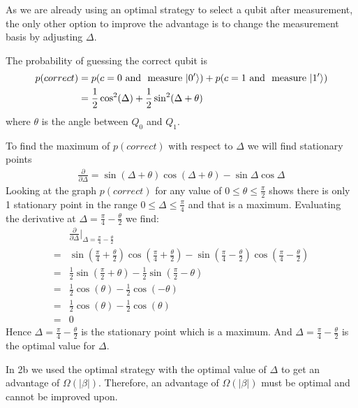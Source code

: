 As we are already using an optimal strategy to select a qubit after measurement, the only other option to improve the advantage is to change the measurement basis by adjusting $\Delta$.

The probability of guessing the correct qubit is 
\begin{align*}
    p(correct) &= p(c=0 \text{ and } \text{ measure } \lvert0'\rangle) + p(c=1 \text{ and } \text{ measure } \lvert1'\rangle)\\
    &=\frac{1}{2} \cos^2 (\Delta) + \frac{1}{2}\sin^2(\Delta + \theta) 
\end{align*}
where $\theta$ is the angle between $Q_0$ and $Q_1$.

To find the maximum of $p(correct)$ with respect to $\Delta$ we will find stationary points
\begin{align*}
    \frac{\partial }{\partial \Delta} = \sin (\Delta + \theta) \cos (\Delta + \theta) - \sin \Delta \cos \Delta
\end{align*}
Looking at the graph $p(correct)$ for any value of $0\leq\theta\leq\frac{\pi}{2}$ shows there is only 1 stationary point in the range $0\leq \Delta \leq \frac{\pi}{4}$ and that is a maximum.
Evaluating the derivative at $\Delta = \frac{\pi}{4} - \frac{\theta}{2}$ we find:
\begin{align*}
    &\frac{\partial }{\partial \Delta}\Bigr\rvert_{\Delta = \frac{\pi}{4} - \frac{\theta}{2}}\\
    =& \sin (\frac{\pi}{4} + \frac{\theta}{2} ) \cos (\frac{\pi}{4} + \frac{\theta}{2} ) - \sin(\frac{\pi}{4} - \frac{\theta}{2}) \cos(\frac{\pi}{4} - \frac{\theta}{2})\\
    =& \frac{1}{2}\sin (\frac{\pi}{2} + \theta ) - \frac{1}{2}\sin(\frac{\pi}{2} - \theta)\\
    =& \frac{1}{2}\cos (\theta ) - \frac{1}{2}\cos(- \theta)\\
    =& \frac{1}{2}\cos (\theta ) - \frac{1}{2}\cos( \theta)\\
    =& 0
\end{align*}
Hence $\Delta = \frac{\pi}{4} - \frac{\theta}{2}$ is the stationary point which is a maximum.
And $\Delta = \frac{\pi}{4} - \frac{\theta}{2}$ is the optimal value for $\Delta$.

In 2b we used the optimal strategy with the optimal value of $\Delta$ to get an advantage of $\Omega(|\beta|)$.
Therefore, an advantage of $\Omega(|\beta|)$ must be optimal and cannot be improved upon.
